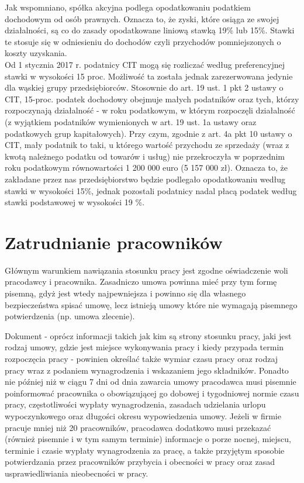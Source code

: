 \documentclass[11pt]{article}
\begin{document}
	Jak wspomniano, spółka akcyjna podlega opodatkowaniu podatkiem dochodowym od osób prawnych. Oznacza to, że zyski, które osiąga ze swojej działalności, są co do zasady opodatkowane liniową stawką 19\% lub 15\%. Stawki te stosuje się w odniesieniu do dochodów czyli przychodów pomniejszonych o koszty uzyskania.\\
	Od 1 stycznia 2017 r. podatnicy CIT mogą się rozliczać według preferencyjnej stawki w wysokości 15 proc. Możliwość ta została jednak zarezerwowana jedynie dla wąskiej grupy przedsiębiorców. Stosownie do art. 19 ust. 1 pkt 2 ustawy o CIT, 15-proc. podatek dochodowy obejmuje małych podatników oraz tych, którzy rozpoczynają działalność - w roku podatkowym, w którym rozpoczęli działalność (z wyjątkiem podatników wymienionych w art. 19 ust. 1a ustawy oraz podatkowych grup kapitałowych). Przy czym, zgodnie z art. 4a pkt 10 ustawy o CIT, mały podatnik to taki, u którego wartość przychodu ze sprzedaży (wraz z kwotą należnego podatku od towarów i usług) nie przekroczyła w poprzednim roku podatkowym równowartości 1 200 000 euro (5 157 000 zł). Oznacza to, że zakładane przez nas przedsiębiorstwo będzie podlegało opodatkowaniu według stawki w wysokości 15\%, jednak pozostali podatnicy nadal płacą podatek według stawki podstawowej w wysokości 19 \%.
	
	\section{Zatrudnianie pracowników}
	Głównym warunkiem nawiązania stosunku pracy jest zgodne oświadczenie woli pracodawcy i pracownika. Zasadniczo umowa powinna mieć przy tym formę pisemną, gdyż jest wtedy najpewniejsza i powinno się dla własnego bezpieczeństwa spisać umowę, lecz istnieją umowy które nie wymagają pisemnego potwierdzenia (np. umowa zlecenie).
	
	Dokument - oprócz informacji takich jak kim są strony stosunku pracy, jaki jest rodzaj umowy, gdzie jest miejsce wykonywania pracy i kiedy przypada termin rozpoczęcia pracy - powinien określać także wymiar czasu pracy oraz rodzaj pracy wraz z podaniem wynagrodzenia i wskazaniem jego składników.
	Ponadto nie później niż w ciągu 7 dni od dnia zawarcia umowy pracodawca musi pisemnie poinformować pracownika o obowiązującej go dobowej i tygodniowej normie czasu pracy, częstotliwości wypłaty wynagrodzenia, zasadach udzielania urlopu wypoczynkowego oraz długości okresu wypowiedzenia umowy. Jeżeli w firmie pracuje mniej niż 20 pracowników, pracodawca dodatkowo musi przekazać (również pisemnie i w tym samym terminie) informacje o porze nocnej, miejscu, terminie i czasie wypłaty wynagrodzenia za pracę, a także przyjętym sposobie potwierdzania przez pracowników przybycia i obecności w pracy oraz zasad usprawiedliwiania nieobecności w pracy.
	
\end{document}
